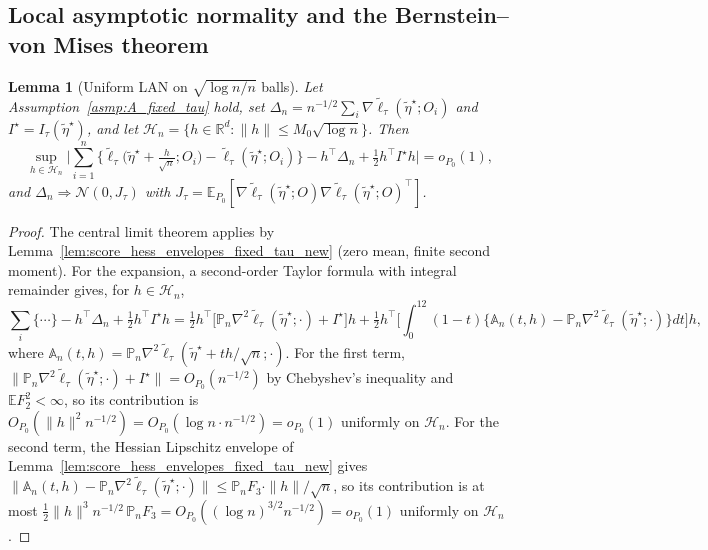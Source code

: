 \documentclass[11pt]{article}
\newtheorem{lemma}{Lemma}
\theoremstyle{definition}
\theoremstyle{plain}
\newcommand{\E}{\mathbb{E}}
\newcommand{\R}{\mathbb{R}}
\begin{document}
\subsection{Local asymptotic normality and the Bernstein--von Mises theorem}

\begin{lemma}[Uniform LAN on $\sqrt{\log n/n}$ balls]
\label{lem:lan_fixed_tau_new}
Let Assumption~\ref{asmp:A_fixed_tau} hold, set
$\Delta_n=n^{-1/2}\sum_i\nabla\tilde\ell_\tau(\tilde\eta^\star;O_i)$ and $I^\star=I_\tau(\tilde\eta^\star)$, and let $\mathcal H_n=\{h\in\R^d:\|h\|\le M_0\sqrt{\log n}\}$. Then
\[
\sup_{h\in\mathcal H_n}\bigg|
\sum_{i=1}^n\Big\{\tilde\ell_\tau\big(\tilde\eta^\star+\tfrac{h}{\sqrt n};O_i\big)-\tilde\ell_\tau(\tilde\eta^\star;O_i)\Big\}
-h^\top\Delta_n+\tfrac12h^\top I^\star h\bigg|=o_{P_0}(1),
\]
and $\Delta_n\Rightarrow\mathcal N(0,J_\tau)$ with $J_\tau=\E_{P_0}[\nabla\tilde\ell_\tau(\tilde\eta^\star;O)\nabla\tilde\ell_\tau(\tilde\eta^\star;O)^\top]$.
\end{lemma}

\begin{proof}
The central limit theorem applies by Lemma~\ref{lem:score_hess_envelopes_fixed_tau_new} (zero mean, finite second moment). For the expansion, a second-order Taylor formula with integral remainder gives, for $h\in\mathcal H_n$,
\[
\sum_i\{\cdots\}-h^\top\Delta_n+\tfrac12h^\top I^\star h
=\tfrac12h^\top\Big[\mathbb P_n\nabla^2\tilde\ell_\tau(\tilde\eta^\star;\cdot)+I^\star\Big]h
+\tfrac12h^\top\Big[\int_0^12(1-t)\big\{\mathbb A_n(t,h)-\mathbb P_n\nabla^2\tilde\ell_\tau(\tilde\eta^\star;\cdot)\big\}dt\Big]h,
\]
where $\mathbb A_n(t,h)=\mathbb P_n\nabla^2\tilde\ell_\tau(\tilde\eta^\star+th/\sqrt n;\cdot)$. For the first term,
$\|\mathbb P_n\nabla^2\tilde\ell_\tau(\tilde\eta^\star;\cdot)+I^\star\|=O_{P_0}(n^{-1/2})$ by Chebyshev's inequality and $\E F_2^2<\infty$, so its contribution is $O_{P_0}(\|h\|^2n^{-1/2})=O_{P_0}(\log n\cdot n^{-1/2})=o_{P_0}(1)$ uniformly on $\mathcal H_n$. For the second term, the Hessian Lipschitz envelope of Lemma~\ref{lem:score_hess_envelopes_fixed_tau_new} gives
$\|\mathbb A_n(t,h)-\mathbb P_n\nabla^2\tilde\ell_\tau(\tilde\eta^\star;\cdot)\|\le\mathbb P_nF_3\cdot\|h\|/\sqrt n$,
so its contribution is at most $\tfrac12\|h\|^3n^{-1/2}\,\mathbb P_nF_3=O_{P_0}((\log n)^{3/2}n^{-1/2})=o_{P_0}(1)$ uniformly on $\mathcal H_n$.
\end{proof}
\end{document}
